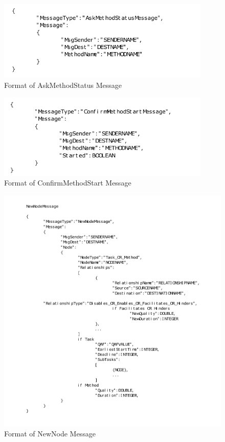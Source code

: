\begin{enumerate}
\begin{figure}[H]
\centering
\includegraphics[width=4in]{figs/AskMethodStatus.pdf}
\caption{Format of AskMethodStatus Message}
\label{fig:AskMethodStatus}
\end{figure}

\begin{figure}[H]
\centering
\includegraphics[width=4in]{figs/ConfirmMethodStart.pdf}
\caption{Format of ConfirmMethodStart Message}
\label{fig:ConfirmMethodStart}
\end{figure}

\begin{figure}[H]
\centering
\includegraphics[width=5in]{figs/NewNodeMessage.pdf}
\caption{Format of NewNode Message}
\label{fig:NewNodeMessage}
\end{figure}


\end{enumerate}

